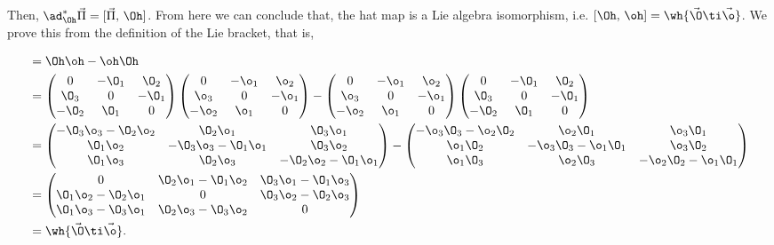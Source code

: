 \noindent
Then, $\ad^*_{\Oh}\vec\Pi = [\vec\Pi,\,\Oh]$. From here we can conclude that, the hat map is a Lie algebra isomorphism, i.e. $ [\Oh,\,\oh] = \wh{\vec\O\ti\vec\o} $. We prove this from the definition of the Lie bracket, that is,

\begin{align*}
  [\Oh, \oh] &= \Oh\oh - \oh\Oh\\
  &= \begin{pmatrix}
    0 & -\O_1 & \O_2 \\ \O_3 & 0 & -\O_1 \\ -\O_2 & \O_1 & 0
  \end{pmatrix}\begin{pmatrix}
    0 & -\o_1 & \o_2 \\ \o_3 & 0 & -\o_1 \\ -\o_2 & \o_1 & 0
  \end{pmatrix} - \begin{pmatrix}
    0 & -\o_1 & \o_2 \\ \o_3 & 0 & -\o_1 \\ -\o_2 & \o_1 & 0
  \end{pmatrix}\begin{pmatrix}
    0 & -\O_1 & \O_2 \\ \O_3 & 0 & -\O_1 \\ -\O_2 & \O_1 & 0
  \end{pmatrix}\\
  &= \begin{pmatrix}
    -\O_3\o_3 - \O_2\o_2 & \O_2\o_1 & \O_3\o_1 \\
    \O_1\o_2 & -\O_3\o_3 - \O_1\o_1 & \O_3\o_2 \\
    \O_1\o_3 & \O_2\o_3 & -\O_2\o_2 - \O_1\o_1
\end{pmatrix} - \begin{pmatrix}
  -\o_3\O_3 - \o_2\O_2 & \o_2\O_1 & \o_3\O_1 \\
  \o_1\O_2 & -\o_3\O_3 - \o_1\O_1 & \o_3\O_2 \\
  \o_1\O_3 & \o_2\O_3 & -\o_2\O_2 - \o_1\O_1
\end{pmatrix} \\
&= \begin{pmatrix}
  0 & \O_2\o_1 - \O_1\o_2 & \O_3\o_1 - \O_1\o_3 \\
  \O_1\o_2 - \O_2\o_1 & 0 & \O_3\o_2 - \O_2\o_3 \\
  \O_1\o_3 - \O_3\o_1 & \O_2\o_3 - \O_3\o_2 & 0
\end{pmatrix} \\
&= \wh{\vec\O \ti \vec\o}.
\end{align*}

